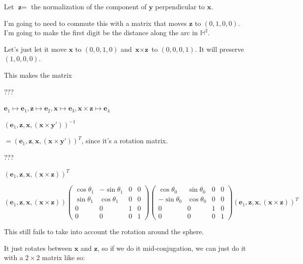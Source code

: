 \documentclass[12pt]{amsart}
\begin{document}
Let $\textbf{z} =$ the normalization of the component of $\textbf{y}$ perpendicular to $\textbf{x}$.

I'm going to need to commute this with a matrix that moves $\textbf{z}$ to $(0,1,0,0)$. I'm going to make the first digit be the distance along the arc in $\mathbb{H}^2$.

Let's just let it move $\textbf{x}$ to $(0,0,1,0)$ and $\textbf{x} \times \textbf{z}$ to $(0,0,0,1)$. It will preserve $(1,0,0,0)$.

This makes the matrix

???

$\textbf{e}_1 \mapsto \textbf{e}_1, \textbf{z} \mapsto \textbf{e}_2, \textbf{x} \mapsto \textbf{e}_3, \textbf{x} \times \textbf{z} \mapsto \textbf{e}_4$

$(\textbf{e}_1, \textbf{z},\textbf{x},(\textbf{x} \times \textbf{y}'))^{-1}$

$= (\textbf{e}_1, \textbf{z},\textbf{x},(\textbf{x} \times \textbf{y}'))^T$, since it's a rotation matrix.

???

$(\textbf{e}_1,\textbf{z},\textbf{x},(\textbf{x} \times \textbf{z}))^T$

$$(\textbf{e}_1,\textbf{z},\textbf{x},(\textbf{x} \times \textbf{z}))
\left(\begin{array}{cccc} \cos\theta_1 & -\sin\theta_1 & 0 & 0 \\ \sin\theta_1 & \cos\theta_1 & 0 & 0 \\ 0 & 0 & 1 & 0 \\ 0 & 0 & 0 & 1 \end{array} \right)
\left(\begin{array}{cccc} \cos\theta_0 & \sin\theta_0 & 0 & 0 \\ -\sin\theta_0 & \cos\theta_0 & 0 & 0 \\ 0 & 0 & 1 & 0 \\ 0 & 0 & 0 & 1 \end{array} \right)
(\textbf{e}_1,\textbf{z},\textbf{x},(\textbf{x} \times \textbf{z}))^T$$

This still fails to take into account the rotation around the sphere.

It just rotates between $\textbf{x}$ and $\textbf{z}$, so if we do it mid-conjugation, we can just do it with a $2 \times 2$ matrix like so:
\end{document}
